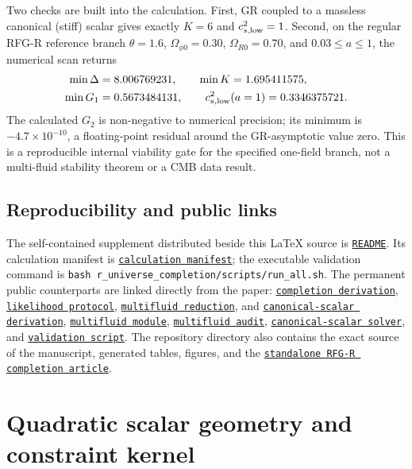 \documentclass[11pt,a4paper]{article}
\newcommand{\RFGRepoURL}{https://github.com/MartinPetrasek123/MartinPetrasek123}
\newcommand{\RFGRepoNamed}[2]{\href{\RFGRepoURL/blob/main/r-universe-complete-chain/rfg-r-completion/r\_universe\_completion/#1}{\texttt{#2}}}
\begin{document}
Two checks are built into the calculation.  First, GR coupled to a massless
canonical (stiff) scalar gives exactly \(K=6\) and
\(c_{s,\rm low}^2=1\).  Second, on the regular RFG-R reference branch
\(\theta=1.6\), \(\Omega_{\phi0}=0.30\), \(\Omega_{R0}=0.70\), and
\(0.03\le a\le1\), the numerical scan returns
\begin{equation}
\begin{aligned}
 \min\Delta&=8.006769231,\qquad
 \min K=1.695411575,\\
 \min G_1&=0.5673484131,\qquad
 c_{s,\rm low}^2(a=1)=0.3346375721.
\end{aligned}
 \label{eq:RFGR-canonical-reference}
\end{equation}
The calculated \(G_2\) is non-negative to numerical precision; its minimum
is \(-4.7\times10^{-10}\), a floating-point residual around the GR-asymptotic
value zero.  This is a reproducible internal viability gate for the specified
one-field branch, not a multi-fluid stability theorem or a CMB data result.

\subsection{Reproducibility and public links}

The self-contained supplement distributed beside this \LaTeX{} source is
\RFGRepoNamed{README.md}{README}. Its calculation manifest is
\RFGRepoNamed{CALCULATION\_MANIFEST.md}{calculation manifest}; the executable validation command is
\texttt{bash r\_universe\_completion/scripts/run\_all.sh}. The permanent
public counterparts are linked directly from the paper:
\RFGRepoNamed{docs/completion\_derivation.md}{completion derivation},
\RFGRepoNamed{docs/likelihood\_pipeline.md}{likelihood protocol},
\RFGRepoNamed{docs/photon\_baryon\_cdm\_neutrino\_reduction.md}{multifluid reduction}, and
\RFGRepoNamed{docs/canonical\_scalar\_reduction.md}{canonical-scalar derivation},
\RFGRepoNamed{scripts/multifluid\_reduction.py}{multifluid module},
\RFGRepoNamed{scripts/validate\_multifluid\_reduction.py}{multifluid audit},
\RFGRepoNamed{scripts/canonical\_scalar.py}{canonical-scalar solver}, and
\RFGRepoNamed{scripts/validate\_completion.py}{validation script}. The repository directory also
contains the exact source of the manuscript, generated tables, figures, and
the \RFGRepoNamed{paper/R\_Universe\_RFG\_R\_Completion.pdf}{standalone RFG-R completion article}.

\section{Quadratic scalar geometry and constraint kernel}
\label{sec:quadratic_scalar}
\end{document}
